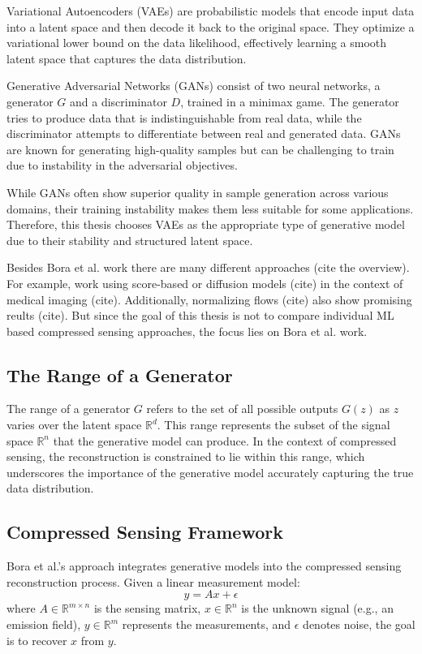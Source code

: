 Variational Autoencoders (VAEs) are probabilistic models that encode input data into a latent space and then decode it back to the original space.
They optimize a variational lower bound on the data likelihood, effectively learning a smooth latent space that captures the data distribution.

Generative Adversarial Networks (GANs) consist of two neural networks, a generator $G$ and a discriminator $D$, trained in a minimax game.
The generator tries to produce data that is indistinguishable from real data, while the discriminator attempts to differentiate between real and generated data.
GANs are known for generating high-quality samples but can be challenging to train due to instability in the adversarial objectives.

While GANs often show superior quality in sample generation across various domains, their training instability makes them less suitable for some applications.
Therefore, this thesis chooses VAEs as the appropriate type of generative model due to their stability and structured latent space.

Besides Bora et al. work there are many different approaches (cite the overview).
For example, work using score-based or diffusion models (cite) in the context of medical imaging (cite).
Additionally, normalizing flows (cite) also show promising reults (cite).
But since the goal of this thesis is not to compare individual ML based compressed sensing approaches, the focus lies on Bora et al. work.

\subsection{The Range of a Generator}

The range of a generator $G$ refers to the set of all possible outputs $G(z)$ as $z$ varies over the latent space $\mathbb{R}^d$.
This range represents the subset of the signal space $\mathbb{R}^n$ that the generative model can produce.
In the context of compressed sensing, the reconstruction is constrained to lie within this range, which underscores the importance of the generative model accurately capturing the true data distribution.

\subsection{Compressed Sensing Framework}

Bora et al.'s approach integrates generative models into the compressed sensing reconstruction process.
Given a linear measurement model:
\begin{equation}
 y = A x + \epsilon
\end{equation}
where $A \in \mathbb{R}^{m \times n}$ is the sensing matrix, $x \in \mathbb{R}^n$ is the unknown signal (e.g., an emission field), $y \in \mathbb{R}^m$ represents the measurements, and $\epsilon$ denotes noise, the goal is to recover $x$ from $y$.

